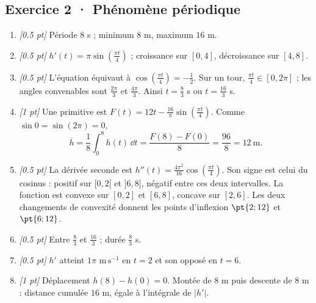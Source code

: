 \subsection*{Exercice 2 · Phénomène périodique}\begin{enumerate}

\item \textit{[\num{0,5} pt]} Période $8$ s ; minimum $8$ m, maximum $16$ m.

\item \textit{[\num{0,5} pt]} $h'(t)=\pi\sin (\frac{\pi t}{4})$ ; croissance sur $[0,4]$, décroissance sur $[4,8]$.

\item \textit{[\num{0,5} pt]} L'équation équivaut à $\cos (\frac{\pi t}{4})=-\frac{1}{2}$. Sur un tour, $\frac{\pi t}{4}\in[0,2\pi]$ ; les angles convenables sont $\frac{2\pi}{3}$ et $\frac{4\pi}{3}$. Ainsi $t=\frac{8}{3}$ s ou $t=\frac{16}{3}$ s.

\item \textit{[1 pt]} Une primitive est $F(t)=12t-\frac{16}{\pi}\sin (\frac{\pi t}{4})$. Comme $\sin0=\sin(2\pi)=0$,
\[\overline h=\frac{1}{8}\int_0^{8}h(t)\,\dd t=\frac{F(8)-F(0)}{8}=\frac{96}{8}=12\ \mathrm{m}.\]

\item \textit{[\num{0,5} pt]} La dérivée seconde est $h''(t)=\frac{4\pi^2}{16}\cos (\frac{\pi t}{4})$. Son signe est celui du cosinus : positif sur $[0,2[$ et $]6,8]$, négatif entre ces deux intervalles. La fonction est convexe sur $[0,2]$ et $[6,8]$, concave sur $[2,6]$. Les deux changements de convexité donnent les points d'inflexion $\pt{2;12}$ et $\pt{6;12}$.

\item \textit{[\num{0,5} pt]} Entre $\frac{8}{3}$ et $\frac{16}{3}$ ; durée $\frac{8}{3}$ s.

\item \textit{[\num{0,5} pt]} $h'$ atteint $1\pi$ $\mathrm{m\,s^{-1}}$ en $t=2$ et son opposé en $t=6$.

\item \textit{[1 pt]} Déplacement $h(8)-h(0)=0$. Montée de $8$ m puis descente de $8$ m : distance cumulée $16$ m, égale à l'intégrale de $|h'|$.

\end{enumerate}


